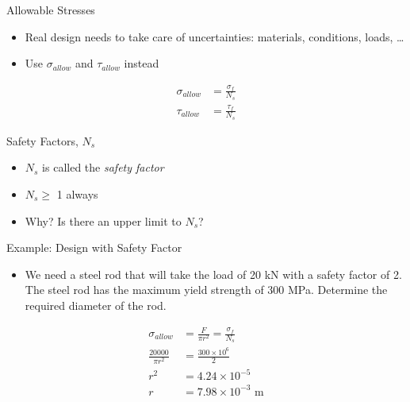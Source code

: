 \documentclass[10pt, svgnames]{beamer}
\begin{document}
\begin{frame}[label={sec:org6fe7099}]{Allowable Stresses}
\begin{itemize}
\item Real design needs to take care of uncertainties: materials,
conditions, loads, \ldots{}

\item Use \(\sigma_{allow}\) and \(\tau_{allow}\) instead
\end{itemize}

\begin{align*}
  \sigma_{allow} &= \frac{\sigma_{f}}{N_{s}} \\
  \tau_{allow} &= \frac{\tau_{f}}{N_{s}}
\end{align*}
\end{frame}

\begin{frame}[label={sec:org07c9a5a}]{Safety Factors, \(N_{s}\)}
\begin{itemize}
\item \(N_{s}\) is called the \emph{safety factor}

\item \(N_{s} \geqslant\) 1 always

\item Why? Is there an upper limit to \(N_{s}\)?
\end{itemize}
\end{frame}

\begin{frame}[label={sec:org40ee555}]{Example: Design with Safety Factor}
\begin{itemize}
\item We need a steel rod that will take the load of 20 kN with a safety
factor of 2. The steel rod has the maximum yield strength of 300 MPa.
Determine the required diameter of the rod.
\end{itemize}

\begin{align*}
    \sigma_{allow} &= \frac{F}{\pi r^{2}} = \frac{\sigma_{f}}{N_{s}} \\
    \frac{20000}{\pi r^{2}} &= \frac{300 \times 10^{6}}{2} \\
    r^{2} &= 4.24 \times 10^{-5} \\
    r &= 7.98 \times 10^{-3} \text{ m}
\end{align*}
\end{frame}
\end{document}
